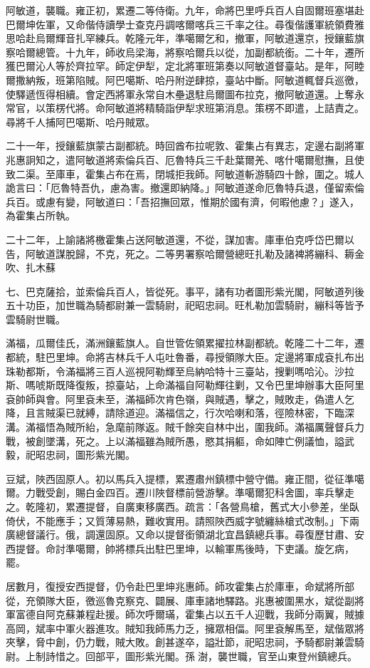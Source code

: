 \begin{pinyinscope}
阿敏道，襲職。雍正初，累遷二等侍衛。九年，命將巴里呼兵百人自固爾班塞堪赴巴爾坤佐軍，又命偕侍讀學士查克丹調喀爾喀兵三千率之往。尋復偕護軍統領費雅思哈赴烏爾輝音扎罕練兵。乾隆元年，準噶爾乞和，撤軍，阿敏道還京，授鑲藍旗察哈爾總管。十九年，師收烏梁海，將察哈爾兵以從，加副都統銜。二十年，遷所獲巴爾沁人等於齊拉罕。師定伊犁，定北將軍班第奏以阿敏道督臺站。是年，阿睦爾撒納叛，班第陷賊。阿巴噶斯、哈丹附逆肆掠，臺站中斷。阿敏道輒督兵巡徼，使驛遞恆得相續。會定西將軍永常自木壘退駐烏爾圖布拉克，撤阿敏道還。上奪永常官，以策楞代將。命阿敏道將精騎詣伊犁求班第消息。策楞不即遣，上詰責之。尋將千人捕阿巴噶斯、哈丹賊眾。

二十一年，授鑲藍旗蒙古副都統。時回酋布拉呢敦、霍集占有異志，定邊右副將軍兆惠詗知之，遣阿敏道將索倫兵百、厄魯特兵三千赴葉爾羌、喀什噶爾慰撫，且使致二渠。至庫車，霍集占布在焉，閉城拒我師。阿敏道斬游騎四十餘，圍之。城人詭言曰：「厄魯特吾仇，慮為害。撤還即納降。」阿敏道遂命厄魯特兵退，僅留索倫兵百。或慮有變，阿敏道曰：「吾招撫回眾，惟期於國有濟，何暇他慮？」遂入，為霍集占所執。

二十二年，上諭諸將檄霍集占送阿敏道還，不從，謀加害。庫車伯克呼岱巴爾以告，阿敏道謀脫歸，不克，死之。二等男署察哈爾營總旺扎勒及諸裨將繃科、耨金吹、扎木蘇

七、巴克薩拾，並索倫兵百人，皆從死。事平，諸有功者圖形紫光閣，阿敏道列後五十功臣，加世職為騎都尉兼一雲騎尉，祀昭忠祠。旺札勒加雲騎尉，繃科等皆予雲騎尉世職。

滿福，瓜爾佳氏，滿洲鑲藍旗人。自世管佐領累擢拉林副都統。乾隆二十二年，遷都統，駐巴里坤。命將吉林兵千人屯吐魯番，尋授領隊大臣。定邊將軍成袞扎布出珠勒都斯，令滿福將三百人巡視阿勒輝至烏納哈特十三臺站，搜剿嗎哈沁。沙拉斯、嗎唬斯既降復叛，掠臺站，上命滿福自阿勒輝往剿，又令巴里坤辦事大臣阿里袞帥師與會。阿里袞未至，滿福師次肯色嶺，與賊遇，擊之，賊敗走，偽遣人乞降，且言賊渠已就縛，請除道迎。滿福信之，行次哈喇和落，徑險林密，下臨深溝。滿福悟為賊所紿，急麾前隊返。賊千餘突自林中出，圍我師。滿福厲聲督兵力戰，被創墜溝，死之。上以滿福雖為賊所愚，愍其捐軀，命如陣亡例議恤，謚武毅，祀昭忠祠，圖形紫光閣。

豆斌，陜西固原人。初以馬兵入提標，累遷肅州鎮標中營守備。雍正間，從征準噶爾。力戰受創，賜白金四百。遷川陜督標前營游擊。準噶爾犯科舍圖，率兵擊走之。乾隆初，累遷提督，自廣東移廣西。疏言：「各營鳥槍，舊式大小參差，坐臥倚伏，不能應手；又質薄易熱，難收實用。請照陜西威字號纏絲槍式改制。」下兩廣總督議行。俄，調還固原。又命以提督銜領湖北宜昌鎮總兵事。尋復歷甘肅、安西提督。命討準噶爾，帥將標兵出駐巴里坤，以輸軍馬後時，下吏議。旋乞病，罷。

居數月，復授安西提督，仍令赴巴里坤兆惠師。師攻霍集占於庫車，命斌將所部從，充領隊大臣，徼巡魯克察克、闢展、庫車諸地驛路。兆惠被圍黑水，斌從副將軍富德自阿克蘇兼程赴援。師次呼爾璊，霍集占以五千人迎戰，我師分兩翼，賊據高岡，斌率中軍火器進攻。賊知我師馬力乏，擁眾相偪。阿里袞解馬至，斌偕眾將夾擊，脅中創，仍力戰，賊大敗。創甚遂卒，謚壯節，祀昭忠祠，予騎都尉兼雲騎尉。上制詩惜之。回部平，圖形紫光閣。孫澍，襲世職，官至山東登州鎮總兵。


\end{pinyinscope}
